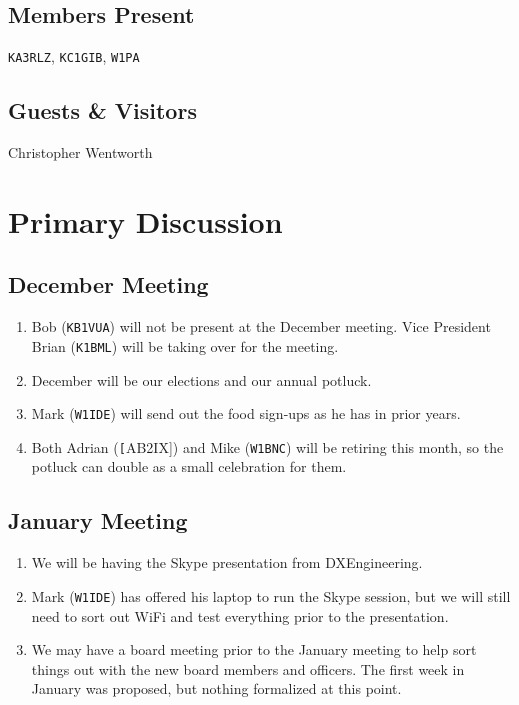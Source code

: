 \documentclass[10pt,letterpaper]{article}
\begin{document}
\subsection{Members Present}
\texttt{KA3RLZ},
\texttt{KC1GIB},
\texttt{W1PA}

\subsection{Guests \& Visitors}
Christopher Wentworth

\section{Primary Discussion}

\subsection{December Meeting}
\begin{enumerate}
  \item Bob (\texttt{KB1VUA}) will not be present at the December meeting. Vice President Brian (\texttt{K1BML}) will be taking over for the meeting.
  \item December will be our elections and our annual potluck.
  \item Mark (\texttt{W1IDE}) will send out the food sign-ups as he has in prior years.
  \item Both Adrian (\texttt[AB2IX]) and Mike (\texttt{W1BNC}) will be retiring this month, so the potluck can double as a small celebration for them.
\end{enumerate}

\subsection{January Meeting}
\begin{enumerate}
  \item We will be having the Skype presentation from DXEngineering.
  \item Mark (\texttt{W1IDE}) has offered his laptop to run the Skype session, but we will still need to sort out WiFi and test everything prior to the presentation.
  \item We may have a board meeting prior to the January meeting to help sort things out with the new board members and officers. The first week in January was proposed, but nothing formalized at this point.
\end{enumerate}
\end{document}
